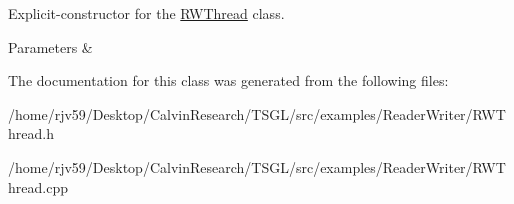 Explicit-\/constructor for the \hyperlink{class_r_w_thread}{R\+W\+Thread} class. 


\begin{DoxyParams}{Parameters}
{\em } & \\
\hline
\end{DoxyParams}


The documentation for this class was generated from the following files\+:\begin{DoxyCompactItemize}
\item 
/home/rjv59/\+Desktop/\+Calvin\+Research/\+T\+S\+G\+L/src/examples/\+Reader\+Writer/R\+W\+Thread.\+h\item 
/home/rjv59/\+Desktop/\+Calvin\+Research/\+T\+S\+G\+L/src/examples/\+Reader\+Writer/R\+W\+Thread.\+cpp\end{DoxyCompactItemize}
